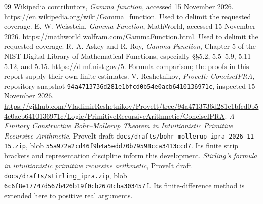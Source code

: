 \documentclass[11pt]{article}
\theoremstyle{definition}
\begin{document}
\begin{thebibliography}{99}
 Wikipedia contributors, \emph{Gamma function}, accessed 15 November 2026. \url{https://en.wikipedia.org/wiki/Gamma_function}. Used to delimit the requested coverage.
 E. W. Weisstein, \emph{Gamma Function}, MathWorld, accessed 15 November 2026. \url{https://mathworld.wolfram.com/GammaFunction.html}. Used to delimit the requested coverage.
 R. A. Askey and R. Roy, \emph{Gamma Function}, Chapter 5 of the NIST Digital Library of Mathematical Functions, especially \S\S5.2, 5.5--5.9, 5.11--5.12, and 5.15. \url{https://dlmf.nist.gov/5}. Formula comparison; the proofs in this report supply their own finite estimates.
 V. Reshetnikov, \emph{ProveIt: ConciseIPRA}, repository snapshot \texttt{94a4713736d281e1bfcd0b54e0acb6410136971c}, inspected 15 November 2026. \url{https://github.com/VladimirReshetnikov/ProveIt/tree/94a4713736d281e1bfcd0b54e0acb6410136971c/Logic/PrimitiveRecursiveArithmetic/ConciseIPRA}.
 \emph{A Finitary Constructive Bohr--Mollerup Theorem in Intuitionistic Primitive Recursive Arithmetic}, ProveIt draft \texttt{docs/drafts/bohr\_mollerup\_ipra\_2026-11-15.zip}, blob \texttt{55a972a2cd46f9b4a5edd70b79598cca3413ccd7}. Its finite strip brackets and representation discipline inform this development.
 \emph{Stirling's formula in intuitionistic primitive recursive arithmetic}, ProveIt draft \texttt{docs/drafts/stirling\_ipra.zip}, blob \texttt{6c6f8e17747d567b426b19f0cb2678cba303457f}. Its finite-difference method is extended here to positive real arguments.
\end{thebibliography}
\end{document}
